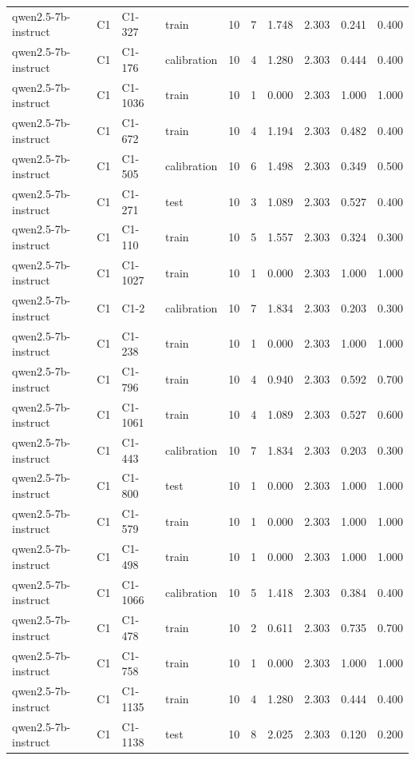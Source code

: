 \begin{table}
\begin{tabular}{llllrrrrrr}
qwen2.5-7b-instruct & C1 & C1-327 & train & 10 & 7 & 1.748 & 2.303 & 0.241 & 0.400 \\
qwen2.5-7b-instruct & C1 & C1-176 & calibration & 10 & 4 & 1.280 & 2.303 & 0.444 & 0.400 \\
qwen2.5-7b-instruct & C1 & C1-1036 & train & 10 & 1 & 0.000 & 2.303 & 1.000 & 1.000 \\
qwen2.5-7b-instruct & C1 & C1-672 & train & 10 & 4 & 1.194 & 2.303 & 0.482 & 0.400 \\
qwen2.5-7b-instruct & C1 & C1-505 & calibration & 10 & 6 & 1.498 & 2.303 & 0.349 & 0.500 \\
qwen2.5-7b-instruct & C1 & C1-271 & test & 10 & 3 & 1.089 & 2.303 & 0.527 & 0.400 \\
qwen2.5-7b-instruct & C1 & C1-110 & train & 10 & 5 & 1.557 & 2.303 & 0.324 & 0.300 \\
qwen2.5-7b-instruct & C1 & C1-1027 & train & 10 & 1 & 0.000 & 2.303 & 1.000 & 1.000 \\
qwen2.5-7b-instruct & C1 & C1-2 & calibration & 10 & 7 & 1.834 & 2.303 & 0.203 & 0.300 \\
qwen2.5-7b-instruct & C1 & C1-238 & train & 10 & 1 & 0.000 & 2.303 & 1.000 & 1.000 \\
qwen2.5-7b-instruct & C1 & C1-796 & train & 10 & 4 & 0.940 & 2.303 & 0.592 & 0.700 \\
qwen2.5-7b-instruct & C1 & C1-1061 & train & 10 & 4 & 1.089 & 2.303 & 0.527 & 0.600 \\
qwen2.5-7b-instruct & C1 & C1-443 & calibration & 10 & 7 & 1.834 & 2.303 & 0.203 & 0.300 \\
qwen2.5-7b-instruct & C1 & C1-800 & test & 10 & 1 & 0.000 & 2.303 & 1.000 & 1.000 \\
qwen2.5-7b-instruct & C1 & C1-579 & train & 10 & 1 & 0.000 & 2.303 & 1.000 & 1.000 \\
qwen2.5-7b-instruct & C1 & C1-498 & train & 10 & 1 & 0.000 & 2.303 & 1.000 & 1.000 \\
qwen2.5-7b-instruct & C1 & C1-1066 & calibration & 10 & 5 & 1.418 & 2.303 & 0.384 & 0.400 \\
qwen2.5-7b-instruct & C1 & C1-478 & train & 10 & 2 & 0.611 & 2.303 & 0.735 & 0.700 \\
qwen2.5-7b-instruct & C1 & C1-758 & train & 10 & 1 & 0.000 & 2.303 & 1.000 & 1.000 \\
qwen2.5-7b-instruct & C1 & C1-1135 & train & 10 & 4 & 1.280 & 2.303 & 0.444 & 0.400 \\
qwen2.5-7b-instruct & C1 & C1-1138 & test & 10 & 8 & 2.025 & 2.303 & 0.120 & 0.200 \\

\end{tabular}
\end{table}

